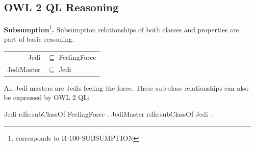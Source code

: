 \documentclass{llncs}
\newcommand{\ms}[1]{\texttt{#1}}
\newenvironment{DL}{
  \scriptsize
  \sffamily
  \vspace{0.3cm}
  \begin{tabular}{r l}

}{
  \end{tabular}
  \linebreak
}
\begin{document}
%

\subsection{OWL 2 QL Reasoning}

\textbf{Subsumption}\footnote{corresponds to R-100-SUBSUMPTION}\textbf{.}
Subsumption relationships of both classes and properties are part of basic reasoning.

\begin{center}
\begin{DL}
Jedi &$\sqsubseteq$ FeelingForce \\
JediMaster &$\sqsubseteq$ Jedi \\
\end{DL}
\end{center}

All Jedi masters are Jedis feeling the force.
These sub-class relationships can also be expressed by OWL 2 QL:

\begin{ex}
Jedi rdfs:subClassOf FeelingForce . 
JediMaster rdfs:subClassOf Jedi . 
\end{ex}
\end{document}

